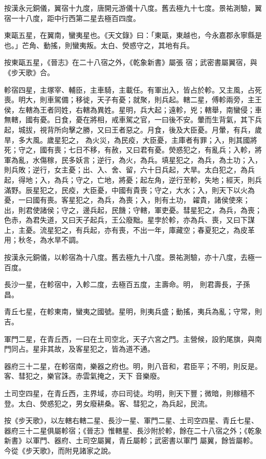 \begin{pinyinscope}
 按漢永元銅儀，翼宿十九度，唐開元游儀十八度。舊去極九十七度。景祐測驗，翼宿一十八度，距中行西第二星去極百四度。



 東甌五星，在翼南，蠻夷星也。《天文錄》曰：「東甌，東越也，今永嘉郡永寧縣是也。」芒角、動搖，則蠻夷叛。太白、熒惑守之，其地有兵。



 按東甌五星，《晉志》在二十八宿之外，《乾象新書》屬張
 宿；武密書屬翼宿，與《步天歌》合。



 軫宿四星，主塚宰、輔臣，主車騎，主載任。有軍出入，皆占於軫。又主風，占死喪。明大，則車駕備；移徙，天子有憂；就聚，則兵起。轄二星，傅軫兩旁，主王侯，左轄為王者同姓，右轄為異姓。星明，兵大起；遠軫，兇；轄舉，南蠻侵；車無轄，國有憂。日食，憂在將相，戒車駕之官，一曰後不安。暈而生背氣，其下兵起，城拔，視背所向擊之勝，又曰王者惡之。月食，後及大臣憂。月暈，有兵，歲旱，多大風。歲星犯之，
 為火災，為民疫，大臣憂，主庫者有罪；入，則其國將死；守之，國有喪；七日不移，有赦，又曰君有憂。熒惑犯之，有亂兵；入軫，將軍為亂，水傷稼，民多妖言；逆行，為火，為兵。填星犯之，為兵，為土功；入，則兵敗；逆行，女主憂；出、入、舍、留，六十日兵起，大旱。太白犯之，為兵起，得地；入，為兵；守之，亡地，將憂；起左角，逆行至軫，失地；經天，則兵滿野。辰星犯之，民疫，大臣憂，中國有貴喪；守之，大水；入，則天下以火為憂，一曰國有喪。客星犯之，為兵，為喪；入，則有土功，
 糴貴，諸侯使來；出，則君使諸侯；守之，邊兵起，民饑；守轄，軍吏憂。彗星犯之，為兵，為喪；色赤，為君失道，又曰天子起兵，王公廢黜。星孛於軫，亦為兵、喪，又曰下謀上，主憂。流星犯之，有兵起，亦有喪，不出一年，庫藏空；春夏犯之，為皮革用；秋冬，為水旱不調。



 按漢永元銅儀，以軫宿為十八度。舊去極九十八度。景祐測驗，亦十八度，去極一百度。



 長沙一星，在軫宿中，入軫二度，去極百五度，主壽命。明，
 則君壽長，子孫昌。



 青丘七星，在軫東南，蠻夷之國號。星明，則夷兵盛；動搖，夷兵為亂；守常，則吉。



 軍門二星，在青丘西，一曰在土司空北，天子六宮之門。主營候，設豹尾旗，與南門同占。星非其故，及客星犯之，皆為道不通。



 器府三十二星，在軫宿南，樂器之府也。明，則八音和，君臣平；不明，則反是。客、彗犯之，樂官誅。赤雲氣掩之，天下
 音樂廢。



 土司空四星，在青丘西，主界域，亦曰司徒。均明，則天下豐；微暗，則稼穡不登。太白、熒惑犯之，男女廢耕桑。客、彗犯之，為兵起，民流。



 按《步天歌》，以左轄右轄二星、長沙一星、軍門二星、土司空四星、青丘七星、器府三十二星俱屬軫宿；《晉志》惟轄星、長沙附於軫，餘在二十八宿之外；《乾象新書》以軍門、器府、土司空屬翼，青丘屬軫；武密書以軍門
 屬翼，餘皆屬軫。今從《步天歌》，而附見諸家之說。



\end{pinyinscope}